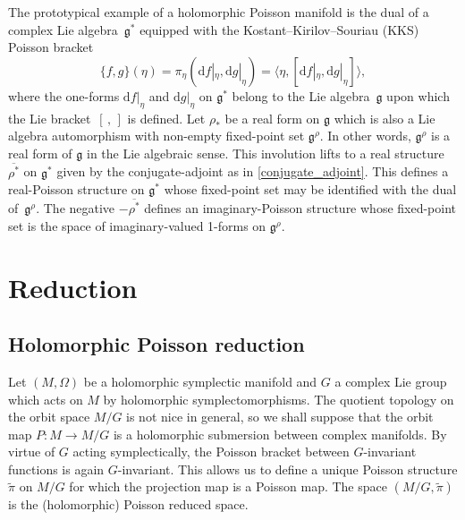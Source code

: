 \documentclass[pdftex]{sigma}
\numberwithin{equation}{section}
\begin{document}
\begin{Example}\label{proto}
	The prototypical example of a holomorphic Poisson manifold is the dual of a complex Lie algebra~$\mathfrak{g}^*$ equipped with the Kostant--Kirilov--Souriau (KKS) Poisson bracket
	\[
	\{f,g\}(\eta)=\pi_\eta(\mathrm{d}f|_\eta,\mathrm{d}g|_\eta)=\langle \eta, [\mathrm{d}f|_\eta,\mathrm{d}g|_\eta]\rangle,
	\]
	where the one-forms $\mathrm{d}f|_\eta$ and $\mathrm{d}g|_\eta$ on $\mathfrak{g}^*$ belong to the Lie algebra~$\mathfrak{g}$ upon which the Lie bracket~$[\,,\,]$ is defined. Let $\rho_*$ be a real form on $\mathfrak{g}$ which is also a Lie algebra automorphism with non-empty fixed-point set $\mathfrak{g}^\rho$. In other words, $\mathfrak{g}^\rho$ is a real form of $\mathfrak{g}$ in the Lie algebraic sense. This involution lifts to a real structure $\overline{\rho^*}$ on $\mathfrak{g}^*$ given by the conjugate-adjoint as in \eqref{conjugate_adjoint}. This defines a real-Poisson structure on $\mathfrak{g}^*$ whose fixed-point set may be identified with the dual of~$\mathfrak{g}^\rho$. The negative $-\overline{\rho^*}$ defines an imaginary-Poisson structure whose fixed-point set is the space of imaginary-valued 1-forms on $\mathfrak{g}^\rho$.
\end{Example}

\section{Reduction}
\subsection{Holomorphic Poisson reduction}
Let $(M,\Omega)$ be a holomorphic symplectic manifold and $G$ a complex Lie group which acts on $M$ by holomorphic symplectomorphisms. The quotient topology on the orbit space $M/G$ is not nice in general, so we shall suppose that the orbit map $P\colon M\rightarrow M/G$ is a holomorphic submersion between complex manifolds. By virtue of $G$ acting symplectically, the Poisson bracket between $G$-invariant functions is again $G$-invariant. This allows us to define a unique Poisson structure $\widetilde{\pi}$ on $M/G$ for which the projection map is a Poisson map. The space $(M/G,\widetilde{\pi})$ is the (holomorphic) {Poisson reduced space}.
\end{document}
